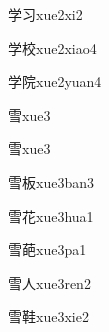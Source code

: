 \begin{verbete}[8;3]{学习}{xue2xi2}
\end{verbete}

\begin{verbete}[8;10]{学校}{xue2xiao4}
\end{verbete}

\begin{verbete}[8;9]{学院}{xue2yuan4}
\end{verbete}

\begin{verbete}[11]{雪}{xue3}
\end{verbete}
\begin{verbete*}[11]{雪}{xue3}
\end{verbete*}

\begin{verbete}[11;8]{雪板}{xue3ban3}
\end{verbete}

\begin{verbete}[11;7]{雪花}{xue3hua1}
\end{verbete}

\begin{verbete}[11;12]{雪葩}{xue3pa1}
\end{verbete}

\begin{verbete}[11;2]{雪人}{xue3ren2}
\end{verbete}

\begin{verbete}[11;15]{雪鞋}{xue3xie2}
\end{verbete}


